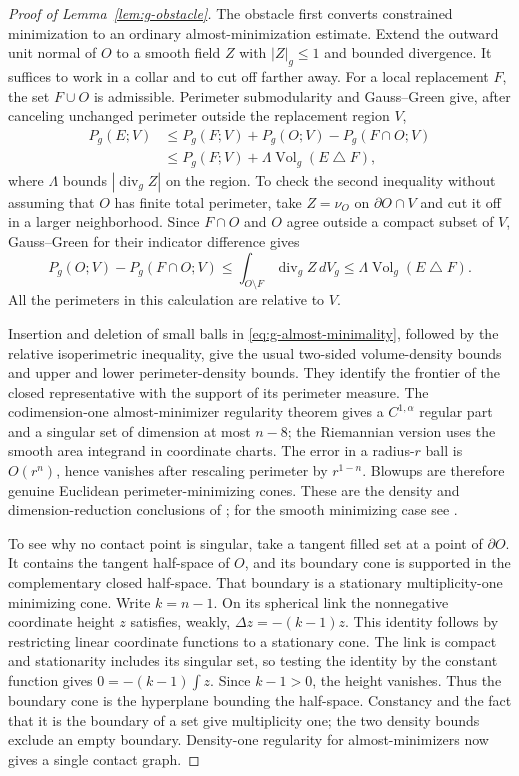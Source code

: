 \begin{proof}[Proof of Lemma~\ref{lem:g-obstacle}]
The obstacle first converts constrained minimization to an ordinary
almost-minimization estimate.  Extend the outward unit normal of
$O$ to a smooth field $Z$ with $|Z|_g\le1$ and bounded divergence.
It suffices to work in a collar and to cut off farther away.  For a
local replacement $F$, the set $F\cup O$ is admissible.  Perimeter
submodularity and Gauss--Green give, after canceling unchanged
perimeter outside the replacement region $V$,
\begin{align}
 P_g(E;V)&\le P_g(F;V)+P_g(O;V)-P_g(F\cap O;V)\nonumber\\
 &\le P_g(F;V)+\Lambda\operatorname{Vol}_g(E\mathbin\triangle F),
 \label{eq:g-almost-minimality}
\end{align}
where $\Lambda$ bounds $|\operatorname{div}_gZ|$ on the region.
To check the second inequality without assuming that $O$ has finite
total perimeter, take $Z=\nu_O$ on $\partial O\cap V$ and cut it off
in a larger neighborhood.  Since $F\cap O$ and $O$ agree outside a
compact subset of $V$, Gauss--Green for their indicator difference gives
\[
 P_g(O;V)-P_g(F\cap O;V)
 \le\int_{O\setminus F}\operatorname{div}_gZ\,dV_g
 \le\Lambda\operatorname{Vol}_g(E\mathbin\triangle F).
\]
All the perimeters in this calculation are relative to $V$.

Insertion and deletion of small balls in
\eqref{eq:g-almost-minimality}, followed by the relative
isoperimetric inequality, give the usual two-sided volume-density
bounds and upper and lower perimeter-density bounds.  They identify
the frontier of the closed representative with the support of its
perimeter measure.  The codimension-one almost-minimizer regularity
theorem gives a $C^{1,\alpha}$ regular part and a singular set of
dimension at most $n-8$; the Riemannian version uses the smooth area
integrand in coordinate charts.  The error in a radius-$r$ ball is
$O(r^n)$, hence vanishes after rescaling perimeter by $r^{1-n}$.
Blowups are therefore genuine Euclidean perimeter-minimizing cones.
These are the density and dimension-reduction conclusions of
\cite[Chapters~21, 26, and 28]{Maggi2012}; for the smooth minimizing
case see \cite[Chapter~7, Theorem~5.8]{SimonGMT}.

To see why no contact point is singular, take a tangent filled set
at a point of $\partial O$.  It contains the tangent half-space of
$O$, and its boundary cone is supported in the complementary closed
half-space.  That boundary is a stationary multiplicity-one
minimizing cone.  Write $k=n-1$.  On its spherical link the
nonnegative coordinate height $z$ satisfies, weakly,
$\Delta z=-(k-1)z$.  This identity follows by restricting linear
coordinate functions to a stationary cone.  The link is compact and
stationarity includes its singular set, so testing the identity by
the constant function gives
$0=-(k-1)\int z$.  Since $k-1>0$, the height vanishes.  Thus the
boundary cone is the hyperplane bounding the half-space.  Constancy
and the fact that it is the boundary of a set give multiplicity one;
the two density bounds exclude an empty boundary.  Density-one
regularity for almost-minimizers now gives a single contact graph.


\end{proof}
